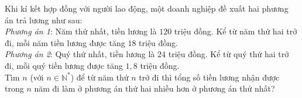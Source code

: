 \begin{ex}%
	Khi kí kết hợp đồng với người lao động, một doanh nghiệp đề xuất hai phương án trả lương như sau:\\
	\textit{Phương án 1}: Năm thứ nhất, tiền lương là $120$ triệu đồng. Kể từ năm thứ hai trở đi, mỗi năm tiền lương được tăng $18$ triệu đồng.\\
	\textit{Phương án 2}: Quý thứ nhất, tiền lương là $24$ triệu đồng. Kể từ quý thứ hai trở đi, mỗi quý tiền lương được tăng $1{,}8$ triệu đồng.\\
	Tìm $n$ (với $n \in \mathbb{N^*}$) để từ năm thứ $n$ trở đi thì tổng số tiền lương nhận được trong $n$ năm đi làm ở phương án thứ hai nhiều hơn ở phương án thứ nhất?
\end{ex}

